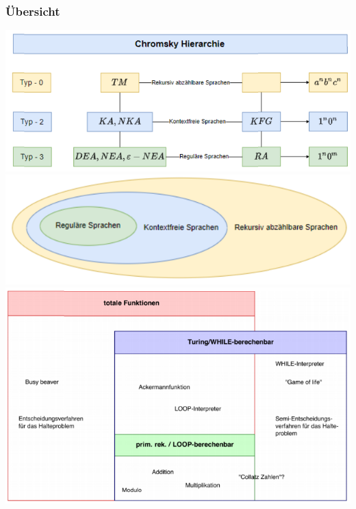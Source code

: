 \subsubsection*{Übersicht}
\includegraphics[width=0.8\linewidth]{images/chomsky_hierarchie.png}\\
\includegraphics[width=0.5\linewidth]{images/sprachen.png}\\
\includegraphics[width=1\linewidth]{images/funktionen.png}
